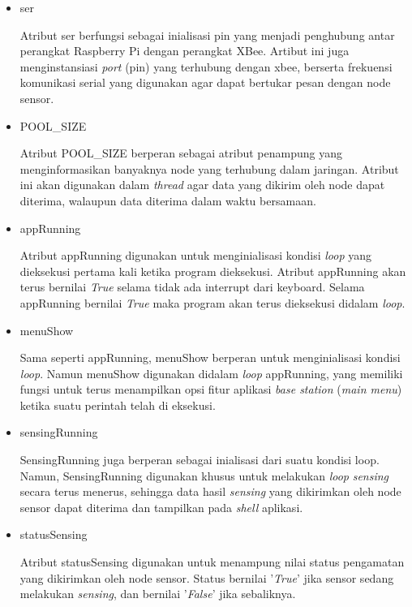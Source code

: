     \begin{itemize}
        \item ser
        
        Atribut ser berfungsi sebagai inialisasi pin yang menjadi penghubung antar perangkat Raspberry Pi dengan perangkat XBee. Artibut ini juga menginstansiasi \textit{port} (pin) yang terhubung dengan xbee, berserta frekuensi komunikasi serial yang digunakan agar dapat bertukar pesan dengan node sensor.  
        
        \item POOL\_SIZE
        
        Atribut POOL\_SIZE berperan sebagai atribut penampung yang menginformasikan banyaknya node yang terhubung dalam jaringan. Atribut ini akan digunakan dalam \textit{thread} agar data yang dikirim oleh node dapat diterima, walaupun data diterima dalam waktu bersamaan.
        
        \item appRunning
        
        Atribut appRunning digunakan untuk menginialisasi kondisi \textit{loop} yang dieksekusi pertama kali ketika program dieksekusi. Atribut appRunning akan terus bernilai \textit{True} selama tidak ada interrupt dari keyboard. Selama appRunning bernilai \textit{True} maka program akan terus dieksekusi didalam \textit{loop}.
        
        \item menuShow
        
        Sama seperti appRunning, menuShow berperan untuk menginialisasi kondisi \textit{loop}. Namun menuShow digunakan didalam \textit{loop} appRunning, yang memiliki fungsi untuk terus menampilkan opsi fitur aplikasi \textit{base station} (\textit{main menu}) ketika suatu perintah telah di eksekusi.
        
        \item sensingRunning
        
        SensingRunning juga berperan sebagai inialisasi dari suatu kondisi loop. Namun, SensingRunning digunakan khusus untuk melakukan \textit{loop} \textit{sensing} secara terus menerus, sehingga data hasil \textit{sensing} yang dikirimkan oleh node sensor dapat diterima dan tampilkan pada \textit{shell} aplikasi.
        
        
        \item statusSensing
        
        Atribut statusSensing digunakan untuk menampung nilai status pengamatan yang dikirimkan oleh node sensor. Status bernilai '\textit{True}' jika sensor sedang melakukan \textit{sensing}, dan bernilai '\textit{False}' jika sebaliknya. 
        

\end{itemize}

